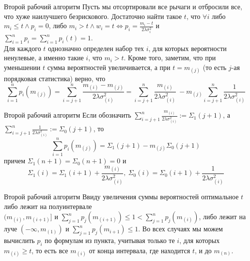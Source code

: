 \documentclass[11pt]{beamer} %
\begin{document}
    \begin{frame}{Второй рабочий алгоритм}
        Пусть мы отсортировали все рычаги и отбросили все, что хуже наилучшего безрискового. Достаточно найти такое $t$, что $\forall i$ либо $m_i \leq t \land p_i = 0$, либо $m_i > t \land w_i = t \Leftrightarrow p_i = \frac{m_i - t}{2\lambda \sigma_i^2}$ и $\sum_{i=1}^n p_i = \sum_{i=1}^n p_i(t) = 1$. \pause \\ Для каждого $t$ однозначно определен набор тех $i$, для которых вероятности ненулевые, а именно такие $i$, что $m_i > t$. Кроме того, заметим, что при уменьшении $t$ сумма вероятностей увеличивается, а при $t = m_{(j)}$ (то есть $j$-ая порядковая статистика) верно, что 
        $$\sum_{i=1}^n p_i(m_{(j)}) = \sum_{i=j+1}^n \frac{m_{(i)} - m_{(j)}}{2 \lambda \sigma_{(i)}^2} = \sum_{i=j+1}^n \frac{m_{(i)}}{2 \lambda \sigma_{(i)}^2} \: - m_{(j)} \sum_{i=j+1}^n \frac{1}{2 \lambda \sigma_{(i)}^2} $$
    \end{frame}
    \begin{frame}{Второй рабочий алгоритм}
        Если обозначить $\sum_{i=j+1}^n \frac{m_{(i)}}{2 \lambda \sigma_{(i)}^2} := \Sigma_1(j+1)$, а $\sum_{i=j+1}^n \frac{1}{2 \lambda \sigma_{(i)}^2} := \Sigma_0(j+1)$, то 
        $$
            \sum_{i=1}^n p_i(m_{(j)}) = \Sigma_1(j+1) - m_{(j)} \Sigma_0(j+1)
        $$
        причем $\Sigma_1(n+1) = \Sigma_0(n+1) = 0$ и $$\Sigma_1(i) = \Sigma_1(i+1) + \frac{m_{(i)}}{2\lambda \sigma_{(i)}^2}, \: \Sigma_0(i) = \Sigma_0(i+1) + \frac{1}{2\lambda \sigma_{(i)}^2}$$
    \end{frame}
    \begin{frame}{Второй рабочий алгоритм}
        Ввиду увеличения суммы вероятностей оптимальное $t$ либо лежит на полуинтервале \\ $(m_{(i)}, m_{(i+1)}]$ и $\sum_{j=1}^n p_j (m_{(i+1)}) \leq 1 < \sum_{j=1}^n p_j (m_{(i)})$, либо лежит на луче $(-\infty, m_{(1)})$ и $\sum_{j=1}^n p_j (m_{i+1}) \leq 1$. Во всех случаях мы можем вычислить $p_i$ по формулам из пункта, учитывая только те $i$, для которых $m_{(i)} \geq t$, то есть все $m_{(i)}$ от конца интервала, где находится $t$, и до $m_{(n)}$.
    \end{frame}
\end{document}
